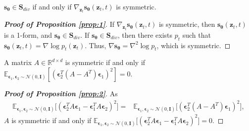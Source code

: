 \documentclass{article}
\theoremstyle{definition}
\theoremstyle{remark}
\begin{document}
	\begingroup
	\renewcommand\theproposition{2}
	\begin{proposition}
		$\mathbf{s}_{\bm{\theta}}\in\mathbf{S}_{div}$ if and only if $\nabla_{\mathbf{z}_{t}}\mathbf{s}_{\bm{\theta}}(\mathbf{z}_{t},t)$ is symmetric.
	\end{proposition}
	\endgroup
	\begin{proof}[\textbf{Proof of Proposition \ref{prop:1}}]
		If $\nabla_{\mathbf{z}_{t}}\mathbf{s}_{\bm{\theta}}(\mathbf{z}_{t},t)$ is symmetric, then $\mathbf{s}_{\bm{\theta}}(\mathbf{z}_{t},t)$ is a 1-form, and $\mathbf{s}_{\bm{\theta}}\in\mathbf{S}_{div}$. If $\mathbf{s}_{\bm{\theta}}\in\mathbf{S}_{div}$, then there exists $p_{t}$ such that $\mathbf{s}_{\bm{\theta}}(\mathbf{z}_{t},t)=\nabla\log{p_{t}(\mathbf{z}_{t})}$. Thus, $\nabla\mathbf{s}_{\bm{\theta}}=\nabla^{2}\log{p_{t}}$, which is symmetric.
	\end{proof}
	
	\begingroup
	\renewcommand\theproposition{3}
	\begin{proposition}
		A matrix $A\in\mathbb{R}^{d\times d}$ is symmetric if and only if $\mathbb{E}_{\bm{\epsilon}_{1},\bm{\epsilon}_{2}\sim\mathcal{N}(0,\mathbf{I})}\left[ (\bm{\epsilon}_{2}^{T}(A-A^{T})\bm{\epsilon}_{1})^{2}\right]=0$.
	\end{proposition}
	\endgroup
	\begin{proof}[\textbf{Proof of Proposition \ref{prop:2}}]
		As
		\begin{align*}
		\mathbb{E}_{\bm{\epsilon}_{1},\bm{\epsilon}_{2}\sim\mathcal{N}(0,\mathbf{I})}\big[(\bm{\epsilon}_{2}^{T}A\bm{\epsilon}_{1}-\bm{\epsilon}_{1}^{T}A\bm{\epsilon}_{2})^{2}\big]=&\mathbb{E}_{\bm{\epsilon}_{1},\bm{\epsilon}_{2}\sim\mathcal{N}(0,\mathbf{I})}\big[(\bm{\epsilon}_{2}^{T}(A-A^{T})\bm{\epsilon}_{1})^{2}\big],
		\end{align*}
		$A$ is symmetric if and only if $\mathbb{E}_{\bm{\epsilon}_{1},\bm{\epsilon}_{2}\sim\mathcal{N}(0,\mathbf{I})}\big[(\bm{\epsilon}_{2}^{T}A\bm{\epsilon}_{1}-\bm{\epsilon}_{1}^{T}A\bm{\epsilon}_{2})^{2}\big]=0$.
	\end{proof}
	
\end{document}
